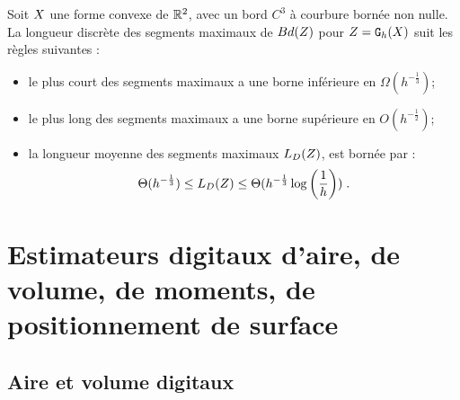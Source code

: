 %
\begin{lemma}{}
  \label{lem:law-length-MDSS}
  Soit $X$ une forme convexe de $\mathbb{R}^2$, avec un bord $C^3$ à
  courbure bornée non nulle. La longueur discrète des segments maximaux de
  $Bd({Z})$ pour $Z = \mathtt{G}_{h}(X)$ suit les règles suivantes :
  \begin{itemize}
    \item le plus court des segments maximaux a une borne inférieure en
    $\Omega(h^{-\frac{1}{3}})$;
    \item le plus long des segments maximaux a une borne supérieure en
    $O(h^{-\frac{1}{2}})$;
    \item la longueur moyenne des segments maximaux $L_D({Z})$, est bornée par :
    \begin{equation}
      \label{eq:lengthMS}
      \Theta(h^{-\frac{1}{3}}) \le L_D( {Z} ) \le \Theta(h^{-\frac{1}{3}} \log \left(\frac{1}{h}\right))\;.
    \end{equation}
  \end{itemize}
\end{lemma}
%
\section{Estimateurs digitaux d'aire, de volume, de moments, de positionnement de surface}
%
\subsection{Aire et volume digitaux}
%
